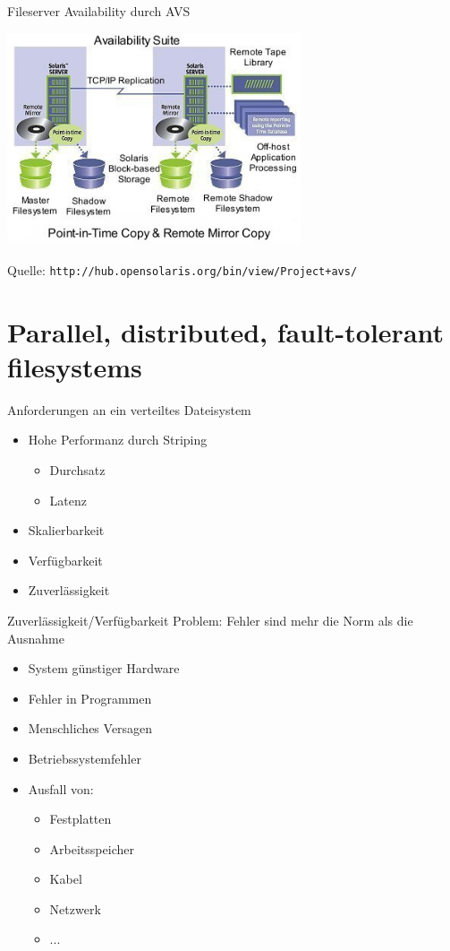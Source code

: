 \documentclass[hyperref={xetex}]{beamer}
\begin{document}
\begin{frame}{Fileserver Availability durch AVS}
	\begin{center}
	\includegraphics[width=0.65\textwidth]{images/availabilitysuitenew.jpg}
	\end{center}
	\small
	Quelle: \texttt{http://hub.opensolaris.org/bin/view/Project+avs/}
\end{frame}

\section{Parallel, distributed, fault-tolerant filesystems}
\begin{frame}{Anforderungen an ein verteiltes Dateisystem}
	\begin{itemize}
		\item Hohe Performanz durch Striping
			\begin{itemize}
				\item Durchsatz
				\item Latenz
			\end{itemize}
		\item Skalierbarkeit
		\item Verf\"ugbarkeit
		\item Zuverl\"assigkeit
	\end{itemize}
\end{frame}

\begin{frame}{Zuverl\"assigkeit/Verf\"ugbarkeit}
	Problem: Fehler sind mehr die Norm als die Ausnahme
	\begin{itemize}
		\item System g\"unstiger Hardware
		\item Fehler in Programmen %
		\item Menschliches Versagen %
		\item Betriebssystemfehler %
		\item Ausfall von: 
		\begin{itemize}
			\item Festplatten
			\item Arbeitsspeicher
			\item Kabel
			\item Netzwerk
			\item ...
		\end{itemize}
	\end{itemize}		
\end{frame}
\end{document}
